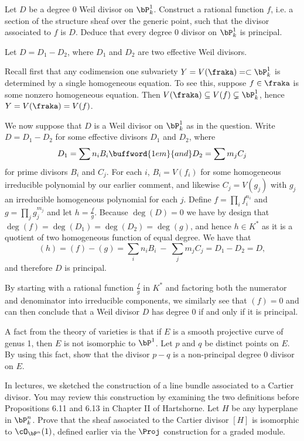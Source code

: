 \begin{homework}[e]
    \prob Let $D$ be a degree $0$ Weil divisor on $\bP^{1}_k$. Construct a rational function $f$, i.e. a section of the structure sheaf over the generic point, such that the divisor associated to $f$ is $D$. Deduce that every degree $0$ divisor on $\bP^{1}_k$ is principal.

	\begin{prf}
		Let $D = D_1 - D_2$, where $D_1$ and $D_2$ are two effective Weil divisors.

		Recall first that any codimension one subvariety $Y = V(\fraka) = \subset \bP^{1}_k$ is determined by a single homogeneous equation. To see this, suppose $f \in \fraka$ is some nonzero homogeneous equation. Then $V(\fraka) \subseteq V(f) \subsetneq \bP^{1}_k$, hence $Y = V(\fraka) = V(f)$.

		We now suppose that $D$ is a Weil divisor on $\bP^{1}_k$ as in the question. Write $D = D_1 - D_2$ for some effective divisors $D_1$ and $D_2$, where
		\[
		D_1 = \sum n_i B_i \buffword{1em}{and} D_2 = \sum m_j C_j
		\]
		for prime divisors $B_i$ and $C_j$. For each $i$, $B_i = V(f_i)$ for some homogeneous irreducible polynomial by our earlier comment, and likewise $C_j = V(g_j)$ with $g_j$ an irreducible homogeneous polynomial for each $j$. Define $f = \prod_i f_i^{n_i}$ and $g = \prod_j g_j^{m_j}$ and let $h= \frac{f}{g}$. Because $\deg(D) = 0$ we have by design that $\deg(f) = \deg(D_1) = \deg(D_2) = \deg(g)$, and hence $h \in K^*$ as it is a quotient of two homogeneous function of equal degree. We have that
		\[
			(h) = (f) - (g) = \sum_i n_i B_i ~-~ \sum_j m_j C_j = D_1 - D_2 = D,
		\]
		and therefore $D$ is principal.

		By starting with a rational function $\frac{f}{g}$ in $K^*$ and factoring both the numerator and denominator into irreducible components, we similarly see that $(f) = 0$ and can then conclude that a Weil divisor $D$ has degree 0 if and only if it is principal.
	\end{prf}

	\prob A fact from the theory of varieties is that if $E$ is a smooth projective curve of genus 1, then $E$ is not isomorphic to $\bP^{1}$. Let $p$ and $q$ be distinct points on $E$. By using this fact, show that the divisor $p-q$ is a non-principal degree 0 divisor on $E$.

	\prob In lectures, we sketched the construction of a line bundle associated to a Cartier divisor. You may review this construction by examining the two definitions before Propositions 6.11 and 6.13 in Chapter II of Hartshorne. Let $H$ be any hyperplane in $\bP^{n}_k$. Prove that the sheaf associated to the Cartier divisor $[H]$ is isomorphic to $\cO_{\bP^n}(1)$, defined earlier via the $\Proj$ construction for a graded module.


\end{homework}
